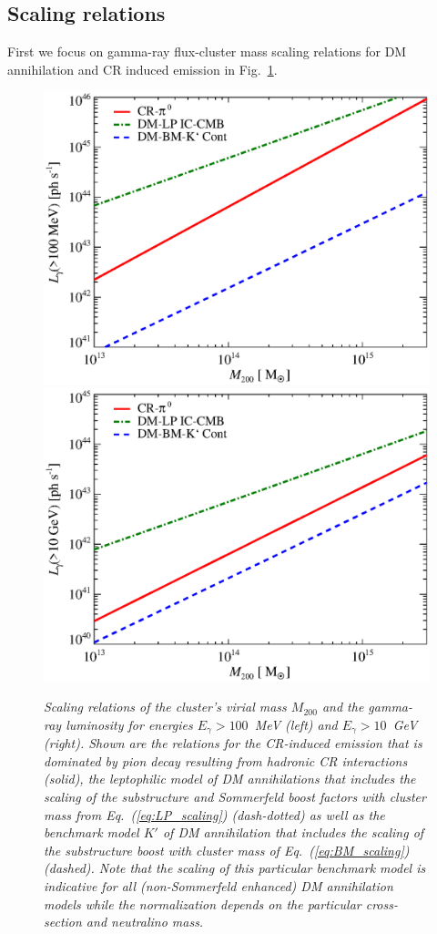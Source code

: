 \documentclass[10pt,aps,pra,reprint,amsmath,amsfonts,amssymb,showpacs,nofootinbib,floatfix]{revtex4-1}
\newcommand{\mvir}{M_{200}}
\begin{document}
\subsection{Scaling relations}
First we focus on gamma-ray flux-cluster mass scaling relations for DM
annihilation and CR induced emission in
Fig.~\ref{fig:lum_mass_scaling}.  
\begin{figure}
  \includegraphics[width=0.99\columnwidth]{figures/MLscaling.100M.eps}
  \includegraphics[width=0.99\columnwidth]{figures/MLscaling.10G.eps}
  \caption{\it Scaling relations of the cluster's virial mass $\mvir$ and the
    gamma-ray luminosity for energies $E_\gamma>100$~MeV (left) and
    $E_\gamma>10$~GeV (right).  Shown are the relations for the CR-induced
    emission that is dominated by pion decay resulting from hadronic CR
    interactions (solid), the leptophilic model of DM annihilations that
    includes the scaling of the substructure and Sommerfeld boost factors with
    cluster mass from Eq.~(\ref{eq:LP_scaling}) (dash-dotted) as well as the
    benchmark model $K'$ of DM annihilation that includes the scaling of the
    substructure boost with cluster mass of Eq.~(\ref{eq:BM_scaling})
    (dashed). Note that the scaling of this particular benchmark model is
    indicative for all (non-Sommerfeld enhanced) DM annihilation models while
    the normalization depends on the particular cross-section and neutralino
    mass.}
\label{fig:lum_mass_scaling}
\end{figure}
\end{document}

